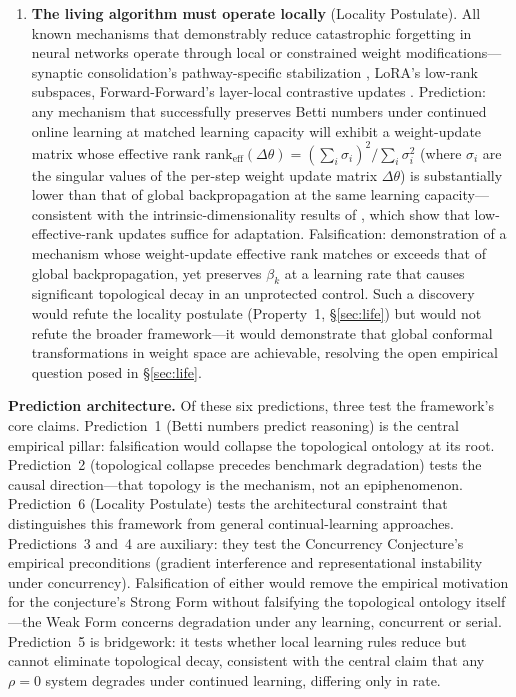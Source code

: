 \documentclass{article}
\begin{document}
\begin{enumerate}
    \item \textbf{The living algorithm must operate locally} (Locality Postulate). All known mechanisms that demonstrably reduce catastrophic forgetting in neural networks operate through local or constrained weight modifications---synaptic consolidation's pathway-specific stabilization \citep{Zenke2017temporal}, LoRA's low-rank subspaces, Forward-Forward's layer-local contrastive updates \citep{Hinton2022forwardforward}. Prediction: any mechanism that successfully preserves Betti numbers under continued online learning at matched learning capacity will exhibit a weight-update matrix whose effective rank $\text{rank}_{\text{eff}}(\Delta\theta) = (\sum_i \sigma_i)^2 / \sum_i \sigma_i^2$ (where $\sigma_i$ are the singular values of the per-step weight update matrix $\Delta\theta$) is substantially lower than that of global backpropagation at the same learning capacity---consistent with the intrinsic-dimensionality results of \citet{Aghajanyan2021intrinsic}, which show that low-effective-rank updates suffice for adaptation. Falsification: demonstration of a mechanism whose weight-update effective rank matches or exceeds that of global backpropagation, yet preserves $\beta_k$ at a learning rate that causes significant topological decay in an unprotected control. Such a discovery would refute the locality postulate (Property~1, \S\ref{sec:life}) but would not refute the broader framework---it would demonstrate that global conformal transformations in weight space are achievable, resolving the open empirical question posed in \S\ref{sec:life}.

\end{enumerate}

\medskip
\noindent\textbf{Prediction architecture.}
Of these six predictions, three test the framework's core claims.
Prediction~1 (Betti numbers predict reasoning) is the central empirical pillar: falsification would collapse the topological ontology at its root.
Prediction~2 (topological collapse precedes benchmark degradation) tests the causal direction---that topology is the mechanism, not an epiphenomenon.
Prediction~6 (Locality Postulate) tests the architectural constraint that distinguishes this framework from general continual-learning approaches.
Predictions~3 and~4 are auxiliary: they test the Concurrency Conjecture's empirical preconditions (gradient interference and representational instability under concurrency). Falsification of either would remove the empirical motivation for the conjecture's Strong Form without falsifying the topological ontology itself---the Weak Form concerns degradation under any learning, concurrent or serial.
Prediction~5 is bridgework: it tests whether local learning rules reduce but cannot eliminate topological decay, consistent with the central claim that any $\rho = 0$ system degrades under continued learning, differing only in rate.
\end{document}

